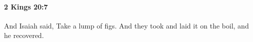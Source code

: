 
		\paragraph{2 Kings 20:7} %
			\label{2KINGS-20-7}

			And Isaiah said, Take a lump of figs. And they took and laid it on the boil, and he recovered.


